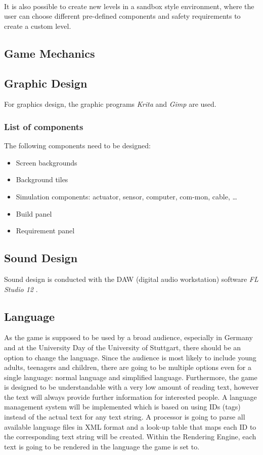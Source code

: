 \\

It is also possible to create new levels in a sandbox style environment, where the user can choose different pre-defined components and
safety requirements to create a custom level.

\subsection{Game Mechanics}\label{subsec:game-mechanics}

\subsection{Graphic Design}\label{subsec:graphic-design}
For graphics design, the graphic programs \textit{Krita} \cite{foundation_2020} and \textit{Gimp} \cite{gimp} are used.

\subsubsection{List of components}
The following components need to be designed:
\begin{itemize}
    \item Screen backgrounds
    \item Background tiles
    \item Simulation components: actuator, sensor, computer, com-mon, cable, \ldots
    \item Build panel
    \item Requirement panel
\end{itemize}

\subsection{Sound Design}\label{subsec:sound-design}
Sound design is conducted with the DAW (digital audio workstation) software \textit{FL Studio 12} \cite{imageline}.

\subsection{Language}\label{subsec:language}
As the game is supposed to be used by a broad audience, especially in Germany and at the University Day of the University of Stuttgart, there should be an option
to change the language.
Since the audience is most likely to include young adults, teenagers and children, there are going to be multiple options even for a single language:
normal language and simplified language.
Furthermore, the game is designed to be understandable with a very low amount of reading text, however the text will always provide further information for interested people.
A language management system will be implemented which is based on using IDs (tags) instead of the actual text for any text string.
A processor is going to parse all available language files in XML format and a look-up table that maps each ID to the corresponding text string will be created.
Within the Rendering Engine, each text is going to be rendered in the language the game is set to.

